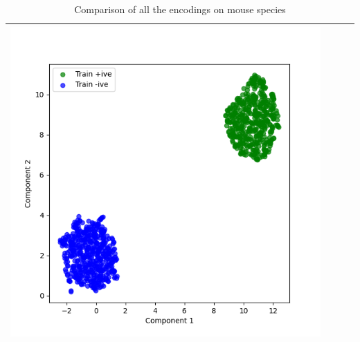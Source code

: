 \begin{table}[htbp]
\begin{tabularx}{\textwidth}{|p{1cm}|X|X|X|}
        \includegraphics[width=\linewidth]{images/encodings/unsupervised/mouse/plot_1_3} \\
        \hline
      \end{tabularx}
      \caption{Comparison of all the encodings on mouse species}\label{tab:dea-unsupervised-encodings-M}
    \end{table}


